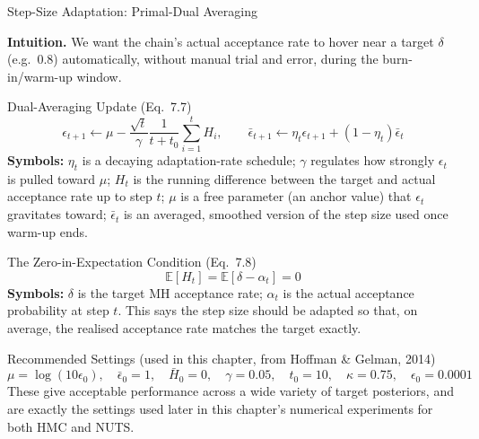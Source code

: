 \documentclass[aspectratio=169,10pt]{beamer}
\newcommand{\Exp}{\mathbb{E}}
\begin{document}
\begin{frame}[allowframebreaks]{Step-Size Adaptation: Primal-Dual Averaging}

\textbf{Intuition.} We want the chain's actual acceptance rate to hover near a target $\delta$ (e.g.\ 0.8) automatically, without manual trial and error, during the burn-in/warm-up window.

\begin{block}{Dual-Averaging Update (Eq.~7.7)}
\[
  \epsilon_{t+1} \leftarrow \mu - \frac{\sqrt{t}}{\gamma}\frac{1}{t+t_0}\sum_{i=1}^{t} H_i,
  \qquad
  \bar\epsilon_{t+1} \leftarrow \eta_t \epsilon_{t+1} + (1-\eta_t)\bar\epsilon_t
\]
\textbf{Symbols:} $\eta_t$ is a decaying adaptation-rate schedule; $\gamma$ regulates how strongly $\epsilon_t$ is pulled toward $\mu$; $H_t$ is the running difference between the target and actual acceptance rate up to step $t$; $\mu$ is a free parameter (an anchor value) that $\epsilon_t$ gravitates toward; $\bar\epsilon_t$ is an averaged, smoothed version of the step size used once warm-up ends.
\end{block}

\begin{block}{The Zero-in-Expectation Condition (Eq.~7.8)}
\[
  \Exp[H_t] = \Exp[\delta - \alpha_t] = 0
\]
\textbf{Symbols:} $\delta$ is the target MH acceptance rate; $\alpha_t$ is the actual acceptance probability at step $t$. This says the step size should be adapted so that, on average, the realised acceptance rate matches the target exactly.
\end{block}

\framebreak

\begin{block}{Recommended Settings (used in this chapter, from Hoffman \& Gelman, 2014)}
\[
  \mu = \log(10\epsilon_0), \quad \bar\epsilon_0 = 1, \quad \bar H_0 = 0, \quad \gamma = 0.05, \quad t_0 = 10, \quad \kappa = 0.75, \quad \epsilon_0 = 0.0001
\]
These give acceptable performance across a wide variety of target posteriors, and are exactly the settings used later in this chapter's numerical experiments for both HMC and NUTS.
\end{block}

\end{frame}
\end{document}
